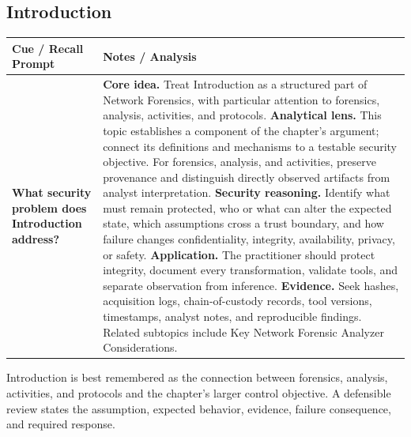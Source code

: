 \documentclass[11pt]{article}
\newcommand{\CornellHeader}{%
\rowcolor{Navy}\color{white}\bfseries Cue / Recall Prompt & \color{white}\bfseries Notes / Analysis\\\hline}
\newcommand{\CornellRow}[2]{%
\cellcolor{CueGray}\RaggedRight\textbf{#1} & \RaggedRight #2\\\hline}
\begin{document}
\subsection*{Introduction}
\begin{longtable}{>{\RaggedRight\arraybackslash}p{}|>{\RaggedRight\arraybackslash}p{}}
\CornellHeader
\CornellRow{What security problem does Introduction address?}{\textbf{Core idea.} Treat Introduction as a structured part of Network Forensics, with particular attention to forensics, analysis, activities, and protocols. \textbf{Analytical lens.} This topic establishes a component of the chapter's argument; connect its definitions and mechanisms to a testable security objective. For forensics, analysis, and activities, preserve provenance and distinguish directly observed artifacts from analyst interpretation. \textbf{Security reasoning.} Identify what must remain protected, who or what can alter the expected state, which assumptions cross a trust boundary, and how failure changes confidentiality, integrity, availability, privacy, or safety. \textbf{Application.} The practitioner should protect integrity, document every transformation, validate tools, and separate observation from inference. \textbf{Evidence.} Seek hashes, acquisition logs, chain-of-custody records, tool versions, timestamps, analyst notes, and reproducible findings. Related subtopics include Key Network Forensic Analyzer Considerations.}
\end{longtable}
\begin{topicsummary}
Introduction is best remembered as the connection between forensics, analysis, activities, and protocols and the chapter's larger control objective. A defensible review states the assumption, expected behavior, evidence, failure consequence, and required response.
\end{topicsummary}
\end{document}
